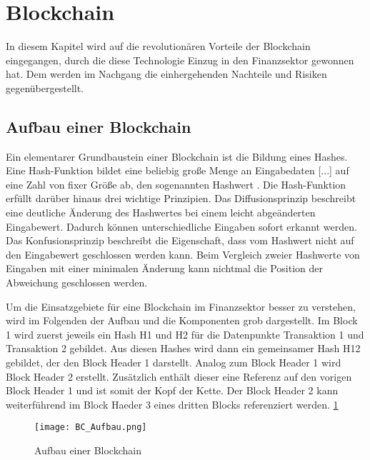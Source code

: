 \section{Blockchain}
In diesem Kapitel wird auf die revolutionären Vorteile der Blockchain 
eingegangen, durch die diese Technologie Einzug in den Finanzsektor gewonnen 
hat. Dem werden im Nachgang die einhergehenden Nachteile und Risiken gegenübergestellt. 

\subsection{Aufbau einer Blockchain}
Ein elementarer Grundbaustein einer Blockchain ist die Bildung eines Hashes.
\glqq Eine Hash-Funktion bildet eine beliebig große Menge an Eingabedaten [...] auf eine Zahl von 
fixer Größe ab, den sogenannten Hashwert\grqq{} \cite[p.~6]{fill2020blockchain}.
Die Hash-Funktion erfüllt darüber hinaus drei wichtige Prinzipien.
Das Diffusionsprinzip beschreibt eine deutliche Änderung des Hashwertes bei einem leicht
abgeänderten Eingabewert. Dadurch können unterschiedliche Eingaben sofort erkannt werden.
Das Konfusionsprinzip beschreibt die Eigenschaft, dass vom Hashwert nicht auf den Eingabewert
geschlossen werden kann. Beim Vergleich zweier Hashwerte von Eingaben mit einer minimalen
Änderung kann nichtmal die Position der Abweichung geschlossen werden.
\cite[p.~6ff]{fill2020blockchain} 

Um die Einsatzgebiete für eine Blockchain im Finanzsektor besser zu verstehen,
wird im Folgenden der Aufbau und die Komponenten grob dargestellt.
Im Block 1 wird zuerst jeweils ein Hash H1 und H2 für die Datenpunkte Transaktion 1 
und Transaktion 2 gebildet. Aus diesen Hashes wird dann ein gemeinsamer Hash H12 gebildet, 
der den Block Header 1 darstellt.
Analog zum Block Header 1 wird Block Header 2 erstellt. Zusätzlich enthält dieser eine
Referenz auf den vorigen Block Header 1 und ist somit der Kopf der Kette. Der Block Header 2
kann weiterführend im Block Haeder 3 eines dritten Blocks referenziert werden. 
\ref{fig:BC_Aufbau}
\cite[p.~17f]{fill2020blockchain}

\begin{figure}[h!]
    \texttt{[image: BC\_Aufbau.png]}
    \caption{Aufbau einer Blockchain \cite[p.~19]{fill2020blockchain}}
    \label{fig:BC_Aufbau}
\end{figure}

\subsection{}